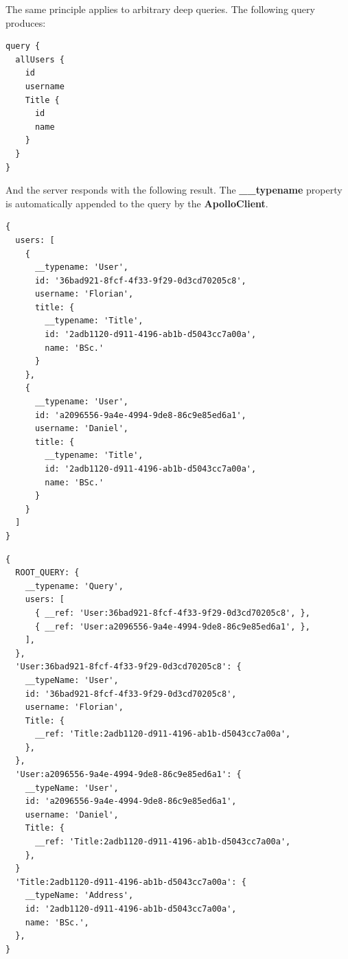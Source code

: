The same principle applies to arbitrary deep queries. The following query produces:

\ifshowListings
\begin{listing}[H]
\begin{verbatim}
query {
  allUsers {
    id
    username
    Title {
      id
      name
    }
  }
}
\end{verbatim}
\caption{An example of a query}\label{code:background:nested-query-user-cache}
\end{listing}
\fi

And the server responds with the following result. The \textbf{\_\_typename} property is automatically appended to the query by the \textbf{ApolloClient}.

\ifshowListings
\begin{listing}[H]
\begin{verbatim}
{
  users: [
    {
      __typename: 'User',
      id: '36bad921-8fcf-4f33-9f29-0d3cd70205c8',
      username: 'Florian',
      title: {
        __typename: 'Title',
        id: '2adb1120-d911-4196-ab1b-d5043cc7a00a',
        name: 'BSc.'
      }
    }, 
    {
      __typename: 'User',
      id: 'a2096556-9a4e-4994-9de8-86c9e85ed6a1',
      username: 'Daniel',
      title: {
        __typename: 'Title',
        id: '2adb1120-d911-4196-ab1b-d5043cc7a00a',
        name: 'BSc.'
      }
    }
  ]
}
\end{verbatim}
\caption{The result of the GraphQL query from listing \ref{code:background:nested-query-user-cache}}\label{code:background:nested-query-user-response-result}
\end{listing}
\fi

\ifshowListings
\begin{listing}[H]
\begin{verbatim}
{
  ROOT_QUERY: {
    __typename: 'Query',
    users: [
      { __ref: 'User:36bad921-8fcf-4f33-9f29-0d3cd70205c8', },
      { __ref: 'User:a2096556-9a4e-4994-9de8-86c9e85ed6a1', },
    ],
  },
  'User:36bad921-8fcf-4f33-9f29-0d3cd70205c8': {
    __typeName: 'User',
    id: '36bad921-8fcf-4f33-9f29-0d3cd70205c8',
    username: 'Florian',
    Title: {
      __ref: 'Title:2adb1120-d911-4196-ab1b-d5043cc7a00a',
    },
  },
  'User:a2096556-9a4e-4994-9de8-86c9e85ed6a1': {
    __typeName: 'User',
    id: 'a2096556-9a4e-4994-9de8-86c9e85ed6a1',
    username: 'Daniel',
    Title: {
      __ref: 'Title:2adb1120-d911-4196-ab1b-d5043cc7a00a',
    },
  }
  'Title:2adb1120-d911-4196-ab1b-d5043cc7a00a': {
    __typeName: 'Address',
    id: '2adb1120-d911-4196-ab1b-d5043cc7a00a',
    name: 'BSc.',
  },
}
\end{verbatim}
\caption{The data inside the cache with the response from listing \ref{code:background:nested-query-user-response-result}}\label{code:background:nested-query-user-cache-representation}
\end{listing}
\fi

